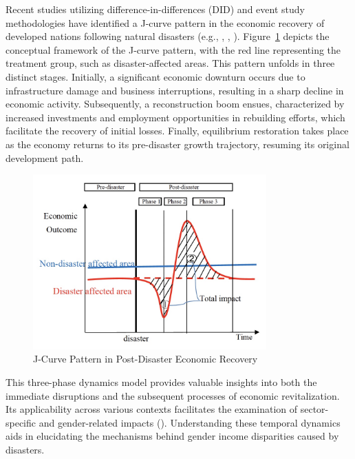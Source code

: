 \documentclass[a4paper,12pt]{article}
\begin{document}
Recent studies utilizing difference-in-differences (DID) and event study methodologies have identified a J-curve pattern in the economic recovery of developed nations following natural disasters (e.g., \citet{Deryugina2018TheReturns}, \citet{Kahraman2023AEarthquake}, \citet{Porcelli2019TheItaly}). Figure~\ref{fig:conceptual_image} depicts the conceptual framework of the J-curve pattern, with the red line representing the treatment group, such as disaster-affected areas. This pattern unfolds in three distinct stages. Initially, a significant economic downturn occurs due to infrastructure damage and business interruptions, resulting in a sharp decline in economic activity. Subsequently, a reconstruction boom ensues, characterized by increased investments and employment opportunities in rebuilding efforts, which facilitate the recovery of initial losses. Finally, equilibrium restoration takes place as the economy returns to its pre-disaster growth trajectory, resuming its original development path.

\begin{figure}[h!]
    \centering
    \includegraphics[width=0.8\textwidth]{conceptual_image.jpeg}
    \caption{J-Curve Pattern in Post-Disaster Economic Recovery}
    \label{fig:conceptual_image}
\end{figure}


This three-phase dynamics model provides valuable insights into both the immediate disruptions and the subsequent processes of economic revitalization. Its applicability across various contexts facilitates the examination of sector-specific and gender-related impacts (\citet{Canessa2021WomensShocks}). Understanding these temporal dynamics aids in elucidating the mechanisms behind gender income disparities caused by disasters.
\end{document}
